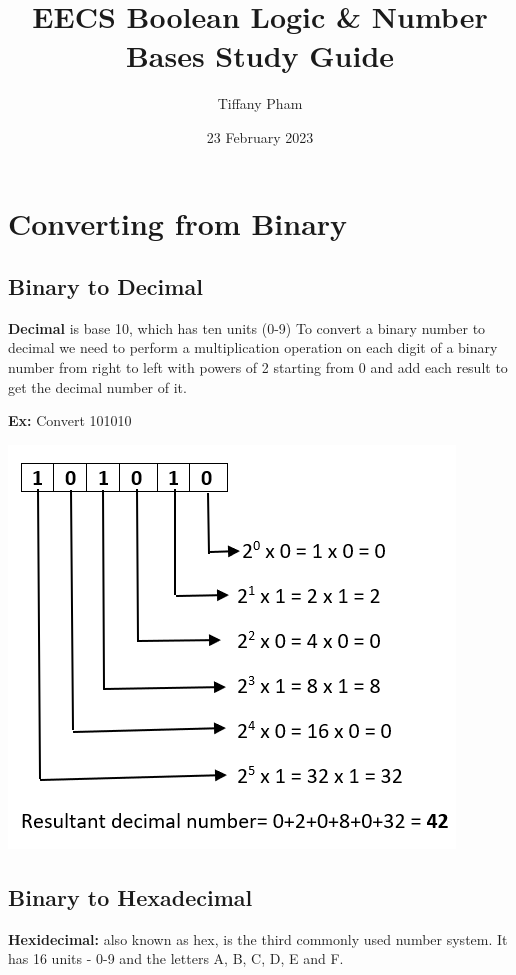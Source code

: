 \documentclass[pstricks,border=11pt]{article}
\title{EECS Boolean Logic \& Number Bases Study Guide}
\author{Tiffany Pham}
\date{23 February 2023}
\begin{document}
\maketitle

\section{Converting from Binary}
\vspace{5mm}
\subsection{Binary to Decimal}
\textbf{Decimal} is base 10, which has ten units (0-9)
\hfill \break
To convert a binary number to decimal we need to perform a multiplication operation on each digit of a binary number from right to left with powers of 2 starting from 0 and add each result to get the decimal number of it.

\hfill \break
\textbf{Ex:}
Convert 101010

\includegraphics[scale=.5]{101010 binary.png}
\hfill \break

\subsection{Binary to Hexadecimal}
\textbf{Hexidecimal:} also known as hex, is the third commonly used number system. It has 16 units - 0-9 and the letters A, B, C, D, E and F.
\hfill \break
\end{document}
